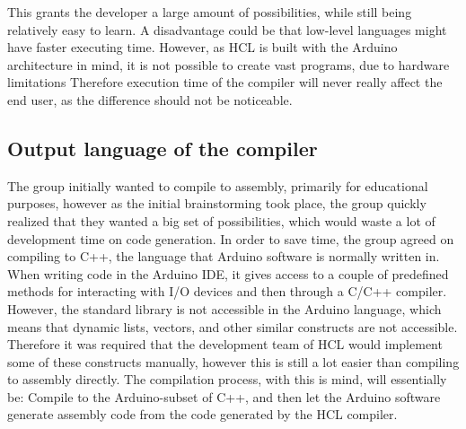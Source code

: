 This grants the developer a large amount of possibilities, while still being relatively easy to learn.
A disadvantage could be that low-level languages might have faster executing time. 
However, as HCL is built with the Arduino architecture in mind, it is not possible to create vast programs, due to hardware limitations
Therefore execution time of the compiler will never really affect the end user, as the difference should not be noticeable.

\subsection{Output language of the compiler}
The group initially wanted to compile to assembly, primarily for educational purposes, however as the initial brainstorming took place, the group quickly realized that they wanted a big set of possibilities, which would waste a lot of development time on code generation. 
In order to save time, the group agreed on compiling to C++, the language that Arduino software is normally written in.
When writing code in the Arduino IDE, it gives access to a couple of predefined methods for interacting with I/O devices and then through a C/C++ compiler\cite{ArFAQ}.
However, the standard library is not accessible in the Arduino language, which means that dynamic lists, vectors, and other similar constructs are not accessible.
Therefore it was required that the development team of HCL would implement some of these constructs manually, however this is still a lot easier than compiling to assembly directly. 
The compilation process, with this is mind, will essentially be: Compile to the Arduino-subset of C++, and then let the Arduino software generate assembly code from the code generated by the HCL compiler.
